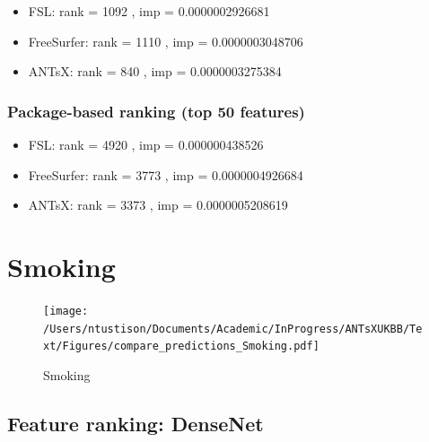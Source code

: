 \documentclass[
  10pt,
]{article}
\begin{document}
\begin{itemize}
\item
  FSL: rank = 1092 , imp = 0.0000002926681
\item
  FreeSurfer: rank = 1110 , imp = 0.0000003048706
\item
  ANTsX: rank = 840 , imp = 0.0000003275384
\end{itemize}

\hypertarget{package-based-ranking-top-50-features-9}{%
\subsubsection{Package-based ranking (top 50
features)}\label{package-based-ranking-top-50-features-9}}

\begin{itemize}
\item
  FSL: rank = 4920 , imp = 0.000000438526
\item
  FreeSurfer: rank = 3773 , imp = 0.0000004926684
\item
  ANTsX: rank = 3373 , imp = 0.0000005208619
\end{itemize}

\clearpage

\hypertarget{smoking}{%
\section{Smoking}\label{smoking}}

\begin{figure}
\centering
\texttt{[image: /Users/ntustison/Documents/Academic/InProgress/ANTsXUKBB/Text/Figures/compare\_predictions\_Smoking.pdf]}
\caption{Smoking}
\end{figure}

\hypertarget{feature-ranking-densenet-1}{%
\subsection{Feature ranking:
DenseNet}\label{feature-ranking-densenet-1}}
\end{document}
